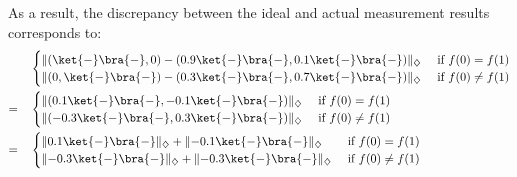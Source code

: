 As a result, the discrepancy between the ideal and actual measurement results corresponds to:
\begin{equation}
  \begin{split}
    \quad &
    \begin{cases}
      \lVert(\ket{-} \bra{-},0) - (0.9\ket{-} \bra{-},0.1\ket{-} \bra{-})   \rVert_{\diamondsuit} &\text{ if }   f(0)= f(1) \\
      \lVert (0,\ket{-} \bra{-}) - (0.3\ket{-} \bra{-}, 0.7\ket{-} \bra{-}) \rVert_{\diamondsuit} &\text{ if }   f(0) \neq f(1) 
    \end{cases} \\
    = \quad &
    \begin{cases}
      \lVert(0.1\ket{-} \bra{-},-0.1\ket{-} \bra{-})   \rVert_{\diamondsuit} &\text{ if }   f(0)= f(1) \\
      \lVert (-0.3\ket{-} \bra{-}, 0.3\ket{-} \bra{-}) \rVert_{\diamondsuit} &\text{ if }   f(0) \neq f(1)
    \end{cases} \\
    = \quad &
    \begin{cases}
      \lVert 0.1\ket{-} \bra{-}\rVert_{\diamondsuit} + \lVert - 0.1 \ket{-} \bra{-}\rVert_{\diamondsuit} &\text{ if }   f(0)= f(1) \\
      \lVert -0.3\ket{-} \bra{-}\rVert_{\diamondsuit} + \lVert - 0.3 \ket{-} \bra{-}\rVert_{\diamondsuit} &\text{ if }   f(0) \neq f(1)
    \end{cases} \\
  \end {split}
  \end{equation}

